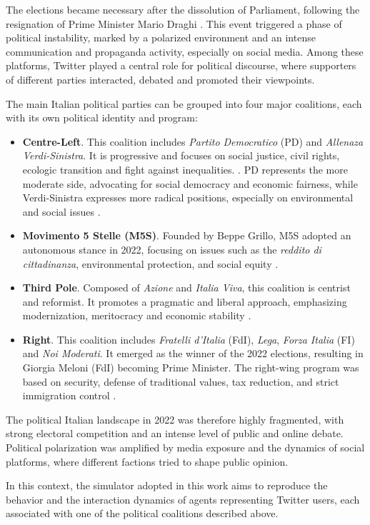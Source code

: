 \medskip
The elections became necessary after the dissolution of Parliament, following the resignation of Prime Minister Mario Draghi \cite{pierri2024drivers}.
This event triggered a phase of political instability, marked by a polarized environment and an intense communication and propaganda activity, especially on social media.
Among these platforms, Twitter played a central role for political discourse, where supporters of different parties interacted, debated and promoted their viewpoints.

\medskip
The main Italian political parties can be grouped into four major coalitions, each with its own political identity and program:

\begin{itemize}
    \item \textbf{Centre-Left}. This coalition includes \textit{Partito Democratico} (PD) and \textit{Allenaza Verdi-Sinistra}. It is progressive and focuses on social justice, civil rights, ecologic transition and fight against inequalities. \cite{wired2022elezioni12punti, ilpost2022partiti}.
    PD represents the more moderate side, advocating for social democracy and economic fairness, while Verdi-Sinistra expresses more radical positions, especially on environmental and social issues \cite{pierri2024drivers}.

    \item \textbf{Movimento 5 Stelle (M5S)}. Founded by Beppe Grillo, M5S adopted an autonomous stance in 2022, focusing on issues such as the \textit{reddito di cittadinanza}, environmental protection, and social equity \cite{pierri2023ita, wired2022elezioni12punti}.

    \item \textbf{Third Pole}. Composed of \textit{Azione} and \textit{Italia Viva}, this coalition is centrist and reformist. 
    It promotes a pragmatic and liberal approach, emphasizing modernization, meritocracy and economic stability \cite{pierri2024drivers, ilpost2022partiti}.

    \item \textbf{Right}. This coalition includes \textit{Fratelli d'Italia} (FdI), \textit{Lega}, \textit{Forza Italia} (FI) and \textit{Noi Moderati}.
    It emerged as the winner of the 2022 elections, resulting in Giorgia Meloni (FdI) becoming Prime Minister.
    The right-wing program was based on security, defense of traditional values, tax reduction, and strict immigration control \cite{wired2022elezioni12punti, ilpost2022partiti, pagellapolitica2022confronto}.
\end{itemize}

The political Italian landscape in 2022 was therefore highly fragmented, with strong electoral competition and an intense level of public and online debate.
Political polarization was amplified by media exposure and the dynamics of social platforms, where different factions tried to shape public opinion.

\medskip
In this context, the simulator adopted in this work aims to reproduce the behavior and the interaction dynamics of agents representing Twitter users, each associated with one of the political coalitions described above.
